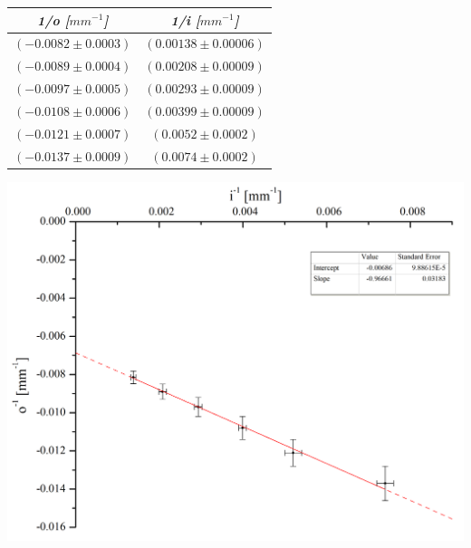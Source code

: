 \documentclass[a4paper,12pt]{article}
\newenvironment{Figure}
  {\par\medskip\noindent\minipage{\linewidth}}
  {\endminipage\par\medskip}
\begin{document}
\begin{multicols*}{2}
\begin{Figure}
            \label{tab:Datosdivnor}
        \end{Figure} 

        \begin{Figure}
            \centering

            \begin{tabular}{cc}
                \toprule
                \textit{\textbf{1/o [$mm^{-1}$]}} & \textit{\textbf{1/i [$mm^{-1}$]}} \\
                \midrule
                $(-0.0082 \pm 0.0003)$ & $(0.00138 \pm 0.00006)$ \\
                $(-0.0089 \pm 0.0004)$ & $(0.00208 \pm 0.00009)$ \\
                $(-0.0097 \pm 0.0005)$ & $(0.00293 \pm 0.00009)$ \\
                $(-0.0108 \pm 0.0006)$ & $(0.00399 \pm 0.00009)$ \\
                $(-0.0121 \pm 0.0007)$ & $(0.0052 \pm 0.0002)$ \\
                $(-0.0137 \pm 0.0009)$ & $(0.0074 \pm 0.0002)$ \\
                \bottomrule 
            \end{tabular}
            \label{tab:Datosdiverinv}
        \end{Figure}

        \begin{Figure}
            \centering
            \includegraphics[width=1\linewidth]{GraficaLD.png}
            \label{fig:Lentediv}
        \end{Figure}


\end{multicols*}
\end{document}
